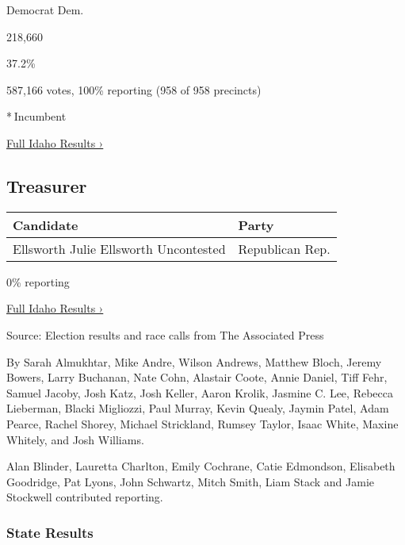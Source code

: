 Democrat Dem.

218,660

37.2\%

587,166 votes, 100\% reporting (958 of 958 precincts)

* Incumbent

\href{https://www.nytimes3xbfgragh.onion/interactive/2018/11/06/us/elections/results-idaho-elections.html}{Full
Idaho Results ›}

\hypertarget{treasurer}{%
\subsection{Treasurer}\label{treasurer}}

\begin{longtable}[]{@{}ll@{}}
\toprule
Candidate & Party\tabularnewline
\midrule
\endhead
 Ellsworth Julie Ellsworth Uncontested & Republican Rep.\tabularnewline
\bottomrule
\end{longtable}

0\% reporting

\href{https://www.nytimes3xbfgragh.onion/interactive/2018/11/06/us/elections/results-idaho-elections.html}{Full
Idaho Results ›}

Source: Election results and race calls from The Associated Press

By Sarah Almukhtar, Mike Andre, Wilson Andrews, Matthew Bloch, Jeremy
Bowers, Larry Buchanan, Nate Cohn, Alastair Coote, Annie Daniel, Tiff
Fehr, Samuel Jacoby, Josh Katz, Josh Keller, Aaron Krolik, Jasmine C.
Lee, Rebecca Lieberman, Blacki Migliozzi, Paul Murray, Kevin Quealy,
Jaymin Patel, Adam Pearce, Rachel Shorey, Michael Strickland, Rumsey
Taylor, Isaac White, Maxine Whitely, and Josh Williams.

Alan Blinder, Lauretta Charlton, Emily Cochrane, Catie Edmondson,
Elisabeth Goodridge, Pat Lyons, John Schwartz, Mitch Smith, Liam Stack
and Jamie Stockwell contributed reporting.

\hypertarget{state-results}{%
\subsubsection{State Results}\label{state-results}}

